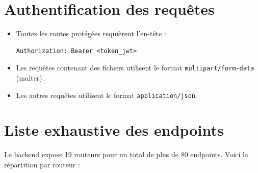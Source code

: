 \documentclass[12pt,a4paper]{report}
\begin{document}
\section{Authentification des requêtes}
\begin{itemize}[leftmargin=*]
    \item Toutes les routes protégées requièrent l'en-tête :
\begin{lstlisting}
Authorization: Bearer <token_jwt>
\end{lstlisting}
    \item Les requêtes contenant des fichiers utilisent le format \texttt{multipart/form-data} (multer).
    \item Les autres requêtes utilisent le format \texttt{application/json}.
\end{itemize}
 
\section{Liste exhaustive des endpoints}
Le backend expose 19 routeurs pour un total de plus de 80 endpoints. Voici la répartition par routeur :
\end{document}
